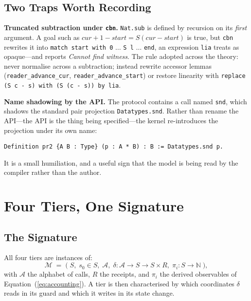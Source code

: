 \documentclass[10pt,journal,compsoc,twocolumn]{article}
\theoremstyle{definition}
\theoremstyle{remark}
\theoremstyle{plain}
\newcommand{\ctr}[1]{\texttt{#1}}
\begin{document}
\subsection{Two Traps Worth Recording}
\label{sec:trap}
\textbf{Truncated subtraction under \ctr{cbn}.} \ctr{Nat.sub} is defined by recursion on its \emph{first} argument. A goal such as \(\mathit{cur}+1-\mathit{start} = S(\mathit{cur}-\mathit{start})\) is true, but \ctr{cbn} rewrites it into \lstinline|match start with 0| \(\ldots\) \lstinline|S l| \(\ldots\) \lstinline|end|, an expression \ctr{lia} treats as opaque---and reports \emph{Cannot find witness}. The rule adopted across the theory: never normalise across a subtraction; instead rewrite accessor lemmas (\ctr{reader\_advance\_cur}, \ctr{reader\_advance\_start}) or restore linearity with \lstinline|replace (S c - s) with (S (c - s)) by lia|.

\textbf{Name shadowing by the API.} The protocol contains a call named \ctr{snd}, which shadows the standard pair projection \lstinline|Datatypes.snd|. Rather than rename the API---the API is the thing being specified---the kernel re-introduces the projection under its own name:
\begin{lstlisting}[language=Coq]
Definition pr2 {A B : Type} (p : A * B) : B := Datatypes.snd p.
\end{lstlisting}
It is a small humiliation, and a useful sign that the model is being read by the compiler rather than the author.

\section{Four Tiers, One Signature}
\label{sec:tiers}

\subsection{The Signature}
All four tiers are instances of:
\begin{equation}
\label{eq:signature}
\mathcal{M} \;=\; \big(\; S,\; s_0 \in S,\; \mathcal{A},\; \delta : \mathcal{A} \to S \to S \times R,\; \pi_i : S \to \mathbb{N} \;\big),
\end{equation}
with \(\mathcal{A}\) the alphabet of calls, \(R\) the receipts, and \(\pi_i\) the derived observables of Equation~(\ref{eq:accounting}). A tier is then characterised by which coordinates \(\delta\) reads in its guard and which it writes in its state change.
\end{document}
